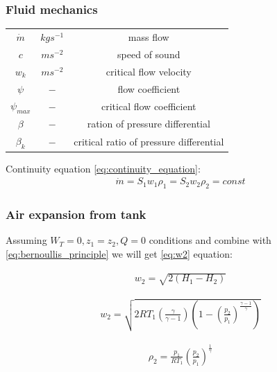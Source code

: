 \documentclass[class=article, crop=false]{standalone}
\begin{document}
\subsubsection{Fluid mechanics}
\begin{tabular}{ |c|c|c| }
    \hline
    $\dot{m}$                   & $kgs^{-1}$  & mass flow \\
    $c$                         & $ms^{-2}$   & speed of sound \\
    $w_k$                       & $ms^{-2}$   & critical flow velocity \\
    $\psi$                      & $-$         & flow coefficient \\
    $\psi_{max}$                & $-$         & critical flow coefficient \\
    $\beta$                     & $-$         & ration of pressure
                                                    differential \\
    $\beta_k$                   & $-$         & critical ratio of pressure
                                                    differential \\

    \hline
\end{tabular}

Continuity equation \ref{eq:continuity_equation}: 
\begin{align}
    \dot{m} = S_1 w_1 \rho_1 = S_2 w_2 \rho_2 = const
    \label{eq:continuity_equation}
\end{align}

\subsubsection{Air expansion from tank}
Assuming $W_T = 0, z_1 = z_2, Q = 0$ conditions and combine with
\ref{eq:bernoullis_principle} we will get \ref{eq:w2} equation:

\begin{align}
    w_2 = \sqrt{2(H_1 - H_2)}
    \label{eq:w2}
\end{align}

\begin{align}
    w_2 =
    \sqrt{2RT_1(\frac{\gamma}{\gamma-1})(1-(\frac{p_2}{p_1})^\frac{\gamma-1}{\gamma})}
    \label{eq:w2_final}
\end{align}

\begin{align}
    \rho_2 = \frac{p_1}{RT_1} (\frac{p_2}{p_1})^{\frac{1}{\gamma}}
    \label{eq:rho2}
\end{align}
\end{document}
